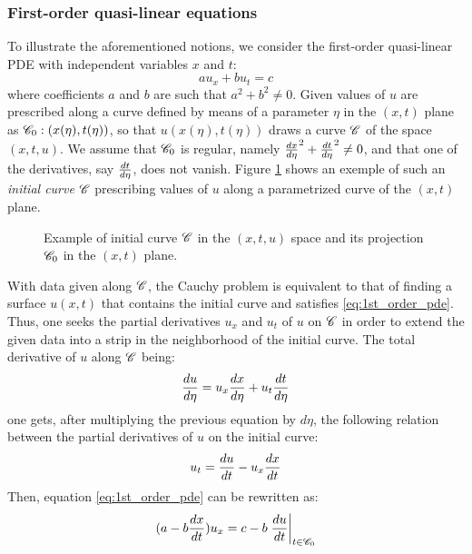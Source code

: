 \subsubsection*{First-order quasi-linear equations}
To illustrate the aforementioned notions, we consider the first-order quasi-linear PDE with independent variables $x$ and $t$:
\begin{equation}
  \label{eq:1st_order_pde}
   a u_x + b u_t  = c
\end{equation}
where coefficients $a$ and $b$ are such that $a^2 + b^2 \neq 0$. Given values of $u$ are prescribed along a curve defined by means of a parameter $\eta$ in the $(x,t)$ plane as $\mathscr{C}_0:(x(\eta),t(\eta))$, so that $u(x(\eta),t(\eta))$ draws a curve $\mathscr{C}$ of the space $(x,t,u)$. 
We assume that $\mathscr{C}_0$ is regular, namely $\frac{d x}{d \eta}^2 + \frac{d t}{d \eta}^2 \neq 0$, and that one of the derivatives, say $\frac{d t}{d \eta}$, does not vanish. Figure \ref{fig:initial_curve} shows an exemple of such an \textit{initial curve} $\mathscr{C}$ prescribing values of $u$ along a parametrized curve of the $(x,t)$ plane.
\begin{figure}[h]
  \centering
  
  \caption{Example of initial curve $\mathscr{C}$ in the $(x,t,u)$ space and its projection $\mathscr{C}_0$ in the $(x,t)$ plane.}
  \label{fig:initial_curve}
\end{figure}
With data given along $\mathscr{C}$, the Cauchy problem is equivalent to that of finding a surface $u(x,t)$ that contains the initial curve and satisfies \eqref{eq:1st_order_pde}.
Thus, one seeks the partial derivatives $u_x$ and $u_t$ of $u$ on $\mathscr{C}$ in order to extend the given data into a strip in the neighborhood of the initial curve.
The total derivative of $u$ along $\mathscr{C}$ being:
\begin{equation}
  \label{eq:dtot_u}
  \frac{d u}{d \eta}=u_x\frac{d x}{d \eta}+u_t\frac{d t}{d \eta}
\end{equation}
one gets, after multiplying the previous equation by $d\eta$, the following relation between the partial derivatives of $u$ on the initial curve:
\begin{equation*}
  u_t= \frac{d u}{d t} - u_x\frac{d x}{d t}
\end{equation*}
Then, equation \eqref{eq:1st_order_pde} can be rewritten as:
\begin{equation}
  \label{eq:normal_form_pde}
  (a - b\frac{d x}{d t})u_x = c - b\left.\frac{d u}{d t}\right|_{t\in\mathscr{C}_0}
\end{equation}
